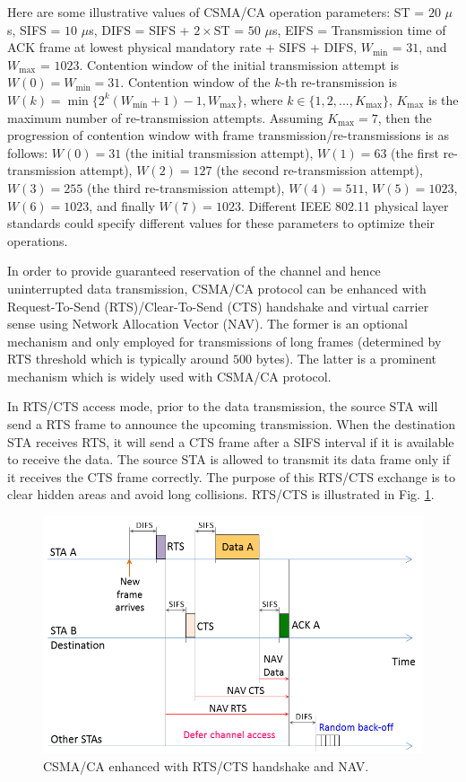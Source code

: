 Here are some illustrative values of CSMA/CA operation parameters: ST = $20$ $\mu$s, SIFS = $10$ $\mu$s, DIFS = SIFS + $2\times$ST = $50$ $\mu$s, EIFS = Transmission time of ACK frame at lowest physical mandatory rate + SIFS + DIFS, $W_{\min}$ = $31$, and $W_{\max}$ = $1023$. Contention window of the initial transmission attempt is $W(0)=W_{\min}=31$. Contention window of the $k$-th re-transmission is $W(k)=\min\{2^{k}(W_{\min}+1)-1, W_{\max}\}$, where $k \in \{1,2, ..., K_{\max}\}$, $K_{\max}$ is the maximum number of re-transmission attempts. Assuming $K_{\max}=7$, then the progression of contention window with frame transmission/re-transmissions is as follows: $W(0)=31$ (the initial transmission attempt), $W(1)=63$ (the first re-transmission attempt), $W(2)=127$ (the second re-transmission attempt), $W(3)=255$ (the third re-transmission attempt), $W(4)=511$, $W(5)=1023$, $W(6)=1023$, and finally $W(7)=1023$. Different IEEE 802.11 physical layer standards could specify different values for these parameters to optimize their operations.

In order to provide guaranteed reservation of the channel and hence uninterrupted data transmission, CSMA/CA protocol can be enhanced with Request-To-Send (RTS)/Clear-To-Send (CTS) handshake and virtual carrier sense using Network Allocation Vector (NAV). The former is an optional mechanism and only employed for transmissions of long frames (determined by RTS threshold which is typically around $500$ bytes). The latter is a prominent mechanism which is widely used with CSMA/CA protocol.

In RTS/CTS access mode, prior to the data transmission, the source STA will send a RTS frame to announce the upcoming transmission. When the destination STA receives RTS, it will send a CTS frame after a SIFS interval if it is available to receive the data. The source STA is allowed to transmit its data frame only if it receives the CTS frame correctly. The purpose of this RTS/CTS exchange is to clear hidden areas and avoid long collisions. RTS/CTS is illustrated in Fig. \ref{figs:802-11-RTS-CTS-NAV}.
\begin{figure}[!ht]
	\centering
	\includegraphics[width=\textwidth]{figs/802-11-RTS-CTS-NAV}
	\caption{CSMA/CA enhanced with RTS/CTS handshake and NAV.}
	\label{figs:802-11-RTS-CTS-NAV}
\end{figure}

